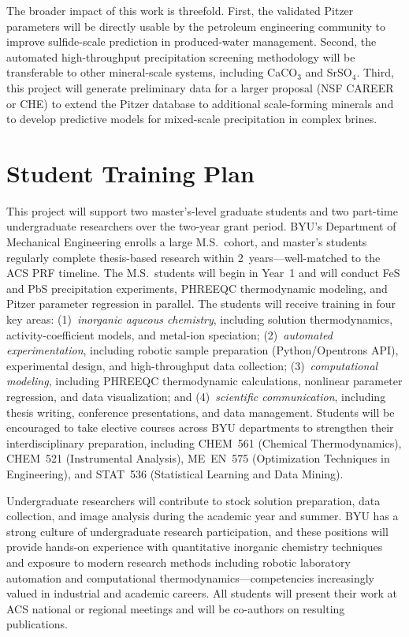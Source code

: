 \documentclass[12pt]{article}
\begin{document}
The broader impact of this work is threefold. First, the validated Pitzer parameters will be directly usable by the petroleum engineering community to improve sulfide-scale prediction in produced-water management. Second, the automated high-throughput precipitation screening methodology will be transferable to other mineral-scale systems, including CaCO$_3$ and SrSO$_4$. Third, this project will generate preliminary data for a larger proposal (NSF CAREER or CHE) to extend the Pitzer database to additional scale-forming minerals and to develop predictive models for mixed-scale precipitation in complex brines.

\section{Student Training Plan}

This project will support two master's-level graduate students and two part-time undergraduate researchers over the two-year grant period. BYU's Department of Mechanical Engineering enrolls a large M.S.\ cohort, and master's students regularly complete thesis-based research within 2~years---well-matched to the ACS PRF timeline. The M.S.\ students will begin in Year~1 and will conduct FeS and PbS precipitation experiments, PHREEQC thermodynamic modeling, and Pitzer parameter regression in parallel. The students will receive training in four key areas: (1)~\textit{inorganic aqueous chemistry}, including solution thermodynamics, activity-coefficient models, and metal-ion speciation; (2)~\textit{automated experimentation}, including robotic sample preparation (Python/Opentrons API), experimental design, and high-throughput data collection; (3)~\textit{computational modeling}, including PHREEQC thermodynamic calculations, nonlinear parameter regression, and data visualization; and (4)~\textit{scientific communication}, including thesis writing, conference presentations, and data management. Students will be encouraged to take elective courses across BYU departments to strengthen their interdisciplinary preparation, including CHEM~561 (Chemical Thermodynamics), CHEM~521 (Instrumental Analysis), ME~EN~575 (Optimization Techniques in Engineering), and STAT~536 (Statistical Learning and Data Mining).

Undergraduate researchers will contribute to stock solution preparation, data collection, and image analysis during the academic year and summer. BYU has a strong culture of undergraduate research participation, and these positions will provide hands-on experience with quantitative inorganic chemistry techniques and exposure to modern research methods including robotic laboratory automation and computational thermodynamics---competencies increasingly valued in industrial and academic careers. All students will present their work at ACS national or regional meetings and will be co-authors on resulting publications.
\end{document}
